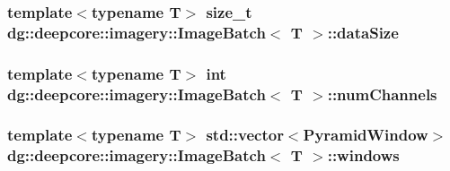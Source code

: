 \subsubsection[{\texorpdfstring{data\+Size}{dataSize}}]{\setlength{\rightskip}{0pt plus 5cm}template$<$typename T$>$ size\+\_\+t {\bf dg\+::deepcore\+::imagery\+::\+Image\+Batch}$<$ T $>$\+::data\+Size}\hypertarget{classdg_1_1deepcore_1_1imagery_1_1_image_batch_ab09934cee7a93fb7477e28f216fe33ac}{}\label{classdg_1_1deepcore_1_1imagery_1_1_image_batch_ab09934cee7a93fb7477e28f216fe33ac}
\subsubsection[{\texorpdfstring{num\+Channels}{numChannels}}]{\setlength{\rightskip}{0pt plus 5cm}template$<$typename T$>$ int {\bf dg\+::deepcore\+::imagery\+::\+Image\+Batch}$<$ T $>$\+::num\+Channels}\hypertarget{classdg_1_1deepcore_1_1imagery_1_1_image_batch_a80cbef4587861d99294c5ca3ee0e7aec}{}\label{classdg_1_1deepcore_1_1imagery_1_1_image_batch_a80cbef4587861d99294c5ca3ee0e7aec}
\subsubsection[{\texorpdfstring{windows}{windows}}]{\setlength{\rightskip}{0pt plus 5cm}template$<$typename T$>$ std\+::vector$<${\bf Pyramid\+Window}$>$ {\bf dg\+::deepcore\+::imagery\+::\+Image\+Batch}$<$ T $>$\+::windows}\hypertarget{classdg_1_1deepcore_1_1imagery_1_1_image_batch_aaad6b20c2ef1174aa8f76316de2f3346}{}\label{classdg_1_1deepcore_1_1imagery_1_1_image_batch_aaad6b20c2ef1174aa8f76316de2f3346}
